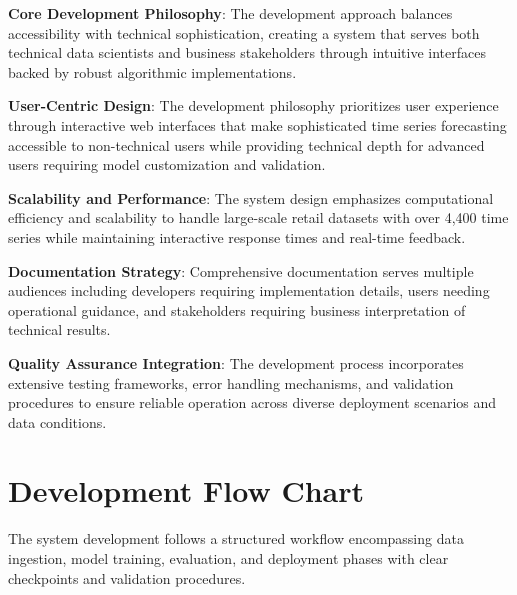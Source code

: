 \textbf{Core Development Philosophy}: The development approach balances accessibility with technical sophistication, creating a system that serves both technical data scientists and business stakeholders through intuitive interfaces backed by robust algorithmic implementations.

\textbf{User-Centric Design}: The development philosophy prioritizes user experience through interactive web interfaces that make sophisticated time series forecasting accessible to non-technical users while providing technical depth for advanced users requiring model customization and validation.

\textbf{Scalability and Performance}: The system design emphasizes computational efficiency and scalability to handle large-scale retail datasets with over 4,400 time series while maintaining interactive response times and real-time feedback.

\textbf{Documentation Strategy}: Comprehensive documentation serves multiple audiences including developers requiring implementation details, users needing operational guidance, and stakeholders requiring business interpretation of technical results.

\textbf{Quality Assurance Integration}: The development process incorporates extensive testing frameworks, error handling mechanisms, and validation procedures to ensure reliable operation across diverse deployment scenarios and data conditions.

\section{Development Flow Chart}

The system development follows a structured workflow encompassing data ingestion, model training, evaluation, and deployment phases with clear checkpoints and validation procedures.

